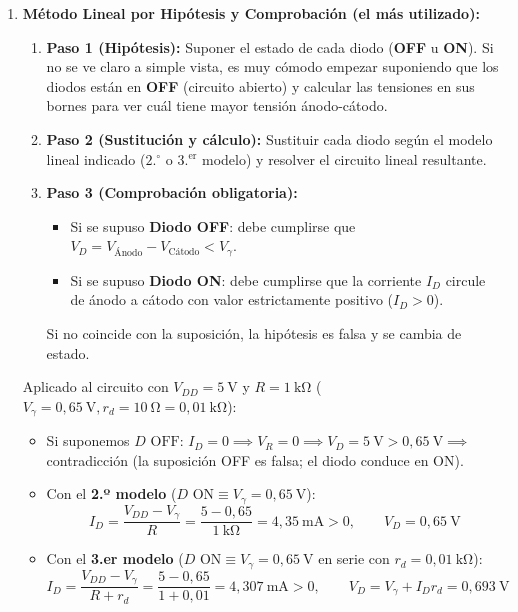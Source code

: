 \begin{enumerate}[leftmargin=*]
    \item \textbf{Método Lineal por Hipótesis y Comprobación (el más utilizado):}
    \begin{enumerate}[label=\alph*)]
        \item \textbf{Paso 1 (Hipótesis):} Suponer el estado de cada diodo (\textbf{OFF} u \textbf{ON}). Si no se ve claro a simple vista, es muy cómodo empezar suponiendo que los diodos están en \textbf{OFF} (circuito abierto) y calcular las tensiones en sus bornes para ver cuál tiene mayor tensión ánodo-cátodo.
        \item \textbf{Paso 2 (Sustitución y cálculo):} Sustituir cada diodo según el modelo lineal indicado ($2.^{\circ}$ o $3.^{\text{er}}$ modelo) y resolver el circuito lineal resultante.
        \item \textbf{Paso 3 (Comprobación obligatoria):}
        \begin{itemize}
            \item Si se supuso \textbf{Diodo OFF}: debe cumplirse que $V_D = V_{\text{Ánodo}} - V_{\text{Cátodo}} < V_\gamma$.
            \item Si se supuso \textbf{Diodo ON}: debe cumplirse que la corriente $I_D$ circule de ánodo a cátodo con valor estrictamente positivo ($I_D > 0$).
        \end{itemize}
        Si no coincide con la suposición, la hipótesis es falsa y se cambia de estado.
    \end{enumerate}
    Aplicado al circuito con $V_{DD} = 5\ \si{\volt}$ y $R = 1\ \si{\kilo\ohm}$ ($V_\gamma = 0{,}65\ \si{\volt}, r_d = 10\ \si{\ohm} = 0{,}01\ \si{\kilo\ohm}$):
    \begin{itemize}
        \item Si suponemos $D\text{ OFF}$: $I_D = 0 \implies V_R = 0 \implies V_D = 5\ \si{\volt} > 0{,}65\ \si{\volt} \implies$ contradicción (la suposición OFF es falsa; el diodo conduce en ON).
        \item Con el \textbf{2.º modelo} ($D\text{ ON} \equiv V_\gamma = 0{,}65\ \si{\volt}$):
        \begin{equation}
            I_D = \frac{V_{DD} - V_\gamma}{R} = \frac{5 - 0{,}65}{1\ \si{\kilo\ohm}} = 4{,}35\ \si{\milli\ampere} > 0, \qquad V_D = 0{,}65\ \si{\volt}
        \end{equation}
        \item Con el \textbf{3.er modelo} ($D\text{ ON} \equiv V_\gamma = 0{,}65\ \si{\volt}$ en serie con $r_d = 0{,}01\ \si{\kilo\ohm}$):
        \begin{equation}
            I_D = \frac{V_{DD} - V_\gamma}{R + r_d} = \frac{5 - 0{,}65}{1 + 0{,}01} = 4{,}307\ \si{\milli\ampere} > 0, \qquad V_D = V_\gamma + I_D r_d = 0{,}693\ \si{\volt}
        \end{equation}
    \end{itemize}
\end{enumerate}


